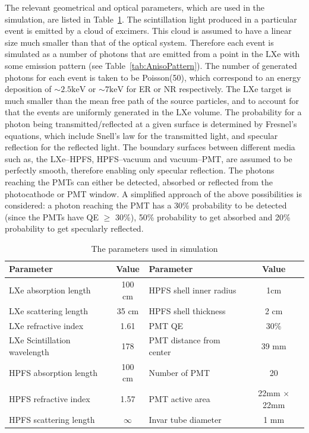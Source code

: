 The relevant geometrical and optical parameters, which are used in the simulation, are listed in Table~\ref{tab:OptPar}. 
The scintillation light produced in a particular 
event is emitted by a cloud of excimers. This cloud is assumed to have a linear size much smaller than that 
of the optical system. Therefore each event is simulated as a number of photons that are emitted from a point 
in the LXe with some emission pattern (see Table~\ref{tab:AnisoPattern}). The number of generated photons for each event is taken to be Poisson(50), which correspond to an energy deposition of $\sim2.5\mathrm{keV}$  or $\sim7\mathrm{keV}$ for ER or NR respectively. The LXe target is much smaller than the mean free path of the source particles, and to 
account for that the events are uniformly generated in the LXe volume.
The probability for a photon being transmitted/reflected at a given surface is 
determined by Fresnel's equations, which include Snell's law for the transmitted light, 
and specular reflection for the reflected light. The boundary surfaces between different media
such as, the LXe--HPFS, HPFS--vacuum and vacuum--PMT, are assumed to be perfectly smooth, 
therefore enabling only specular reflection. 
The photons reaching the PMTs can either be detected, absorbed or reflected from the photocathode 
or PMT window. A simplified approach of the above possibilities is considered:
a photon reaching the PMT has a 30\% probability to be detected (since the PMTs have QE $\geq$ 30\%), 
50\% probability to get absorbed and 20\% probability to get specularly reflected. 

\begin{table}[h]
  \centering
  \caption{The parameters used in simulation}
  \label{tab:OptPar}
  \begin{tabular}{|l c||l c|}
  \hline
  Parameter & Value & Parameter & Value \\
  \hline
  LXe absorption length & 100 cm & HPFS shell inner radius & 1cm \\
  LXe scattering length & 35 cm & HPFS shell thickness & 2 cm\\
  LXe refractive index & 1.61  & PMT QE &  30\% \\
  LXe Scintillation wavelength & 178& PMT distance from center & 39 mm\\
  HPFS absorption length & 100 cm  & Number of PMT & 20 \\
  HPFS refractive index & 1.57 & PMT active area & 22mm $\times$ 22mm \\
  HPFS scattering length & $\infty$ & Invar tube diameter & 1 mm\\
  \hline
 \end{tabular}
\end{table}


